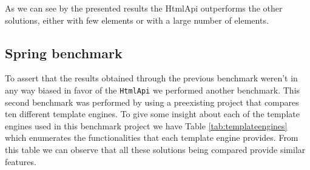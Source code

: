 
\noindent
As we can see by the presented results the HtmlApi outperforms the other solutions, either with few elements or with a large number of elements. 

\subsection{Spring benchmark}
\label{sec:springbenchmark}

To assert that the results obtained through the previous benchmark weren't in any way biased in favor of the \texttt{HtmlApi} we performed another benchmark. This second benchmark was performed by using a preexisting project that compares ten different template engines. To give some insight about each of the template engines used in this benchmark project we have Table \ref{tab:templateengines} which enumerates the functionalities that each template engine provides. From this table we can observe that all these solutions being compared provide similar features. 

